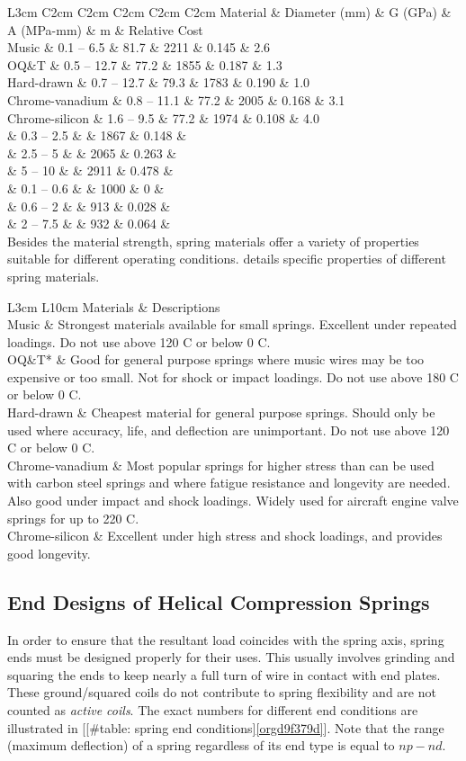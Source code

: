 \documentclass[a4paper,openany,12pt]{book}
\begin{document}
{{ L3cm C2cm C2cm C2cm C2cm C2cm Material \& Diameter (mm) \& G (GPa) \& A
(MPa-mm) \& m \& Relative Cost\\
Music \& 0.1 -- 6.5 \& 81.7 \& 2211 \& 0.145 \& 2.6\\
OQ\&T \& 0.5 -- 12.7 \& 77.2 \& 1855 \& 0.187 \& 1.3\\
Hard-drawn \& 0.7 -- 12.7 \& 79.3 \& 1783 \& 0.190 \& 1.0\\
Chrome-vanadium \& 0.8 -- 11.1 \& 77.2 \& 2005 \& 0.168 \& 3.1\\
Chrome-silicon \& 1.6 -- 9.5 \& 77.2 \& 1974 \& 0.108 \& 4.0\\
\& 0.3 -- 2.5 \& \& 1867 \& 0.148 \&\\
\& 2.5 -- 5 \& \& 2065 \& 0.263 \&\\
\& 5 -- 10 \& \& 2911 \& 0.478 \&\\
\& 0.1 -- 0.6 \& \& 1000 \& 0 \&\\
\& 0.6 -- 2 \& \& 913 \& 0.028 \&\\
\& 2 -- 7.5 \& \& 932 \& 0.064 \&\\

Besides the material strength, spring materials offer a variety of
properties suitable for different operating conditions. details specific
properties of different spring materials.


 L3cm L10cm Materials \& Descriptions\\
Music \& Strongest materials available for small springs. Excellent under
repeated loadings. Do not use above 120 C or below 0 C.\\
OQ\&T* \& Good for general purpose springs where music wires may be too
expensive or too small. Not for shock or impact loadings. Do not use
above 180 C or below 0 C.\\
Hard-drawn \& Cheapest material for general purpose springs. Should only
be used where accuracy, life, and deflection are unimportant. Do not use
above 120 C or below 0 C.\\
Chrome-vanadium \& Most popular springs for higher stress than can be
used with carbon steel springs and where fatigue resistance and
longevity are needed. Also good under impact and shock loadings. Widely
used for aircraft engine valve springs for up to 220 C.\\
Chrome-silicon \& Excellent under high stress and shock loadings, and
provides good longevity.\\

\subsection{End Designs of Helical Compression Springs}
\label{sec:orga66bff0}
In order to ensure that the resultant load coincides with the spring
axis, spring ends must be designed properly for their uses. This usually
involves grinding and squaring the ends to keep nearly a full turn of
wire in contact with end plates. These ground/squared coils do not
contribute to spring flexibility and are not counted as \emph{active coils}.
The exact numbers for different end conditions are illustrated in
[[\#table: spring end conditions]\ref{orgd9f379d}]. Note
that the range (maximum deflection) of a spring regardless of its end
type is equal to \(np - nd\).


}}
\end{document}
